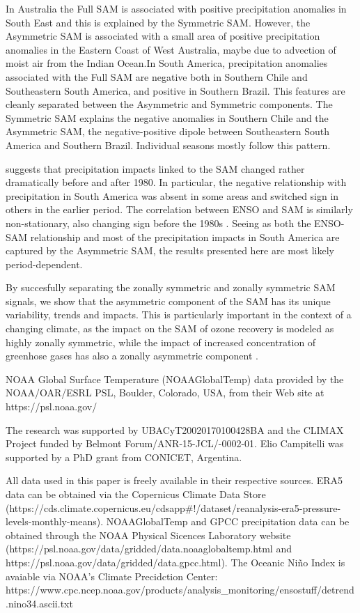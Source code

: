 \documentclass[]{ametsocV5}
\begin{document}
In Australia the Full SAM is associated with positive precipitation
anomalies in South East and this is explained by the Symmetric SAM.
However, the Asymmetric SAM is associated with a small area of positive
precipitation anomalies in the Eastern Coast of West Australia, maybe
due to advection of moist air from the Indian Ocean.In South America,
precipitation anomalies associated with the Full SAM are negative both
in Southern Chile and Southeastern South America, and positive in
Southern Brazil. This features are cleanly separated between the
Asymmetric and Symmetric components. The Symmetric SAM explains the
negative anomalies in Southern Chile and the Asymmetric SAM, the
negative-positive dipole between Southeastern South America and Southern
Brazil. Individual seasons mostly follow this pattern.

\citet{silvestri2009} suggests that precipitation impacts linked to the
SAM changed rather dramatically before and after 1980. In particular,
the negative relationship with precipitation in South America was absent
in some areas and switched sign in others in the earlier period. The
correlation between ENSO and SAM is similarly non-stationary, also
changing sign before the 1980s \citep{fogt2006, clem2013}. Seeing as
both the ENSO-SAM relationship and most of the precipitation impacts in
South America are captured by the Asymmetric SAM, the results presented
here are most likely period-dependent.

By succesfully separating the zonally symmetric and zonally symmetric
SAM signals, we show that the asymmetric component of the SAM has its
unique variability, trends and impacts. This is particularly important
in the context of a changing climate, as the impact on the SAM of ozone
recovery is modeled as highly zonally symmetric, while the impact of
increased concentration of greenhose gases has also a zonally asymmetric
component \citep{arblaster2006, simpkins2012}.

\acknowledgments

NOAA Global Surface Temperature (NOAAGlobalTemp) data provided by the
NOAA/OAR/ESRL PSL, Boulder, Colorado, USA, from their Web site at
https://psl.noaa.gov/

The research was supported by UBACyT20020170100428BA and the CLIMAX
Project funded by Belmont Forum/ANR-15-JCL/-0002-01. Elio Campitelli was
supported by a PhD grant from CONICET, Argentina.

\datastatement

All data used in this paper is freely available in their respective
sources. ERA5 data can be obtained via the Copernicus Climate Data Store
(https://cds.climate.copernicus.eu/cdsapp\#!/dataset/reanalysis-era5-pressure-levels-monthly-means).
NOAAGlobalTemp and GPCC precipitation data can be obtained through the
NOAA Physical Sicences Laboratory website
(https://psl.noaa.gov/data/gridded/data.noaaglobaltemp.html and
https://psl.noaa.gov/data/gridded/data.gpcc.html). The Oceanic Niño
Index is avaiable via NOAA's Climate Precidction Center:
https://www.cpc.ncep.noaa.gov/products/analysis\_monitoring/ensostuff/detrend.nino34.ascii.txt
\end{document}
